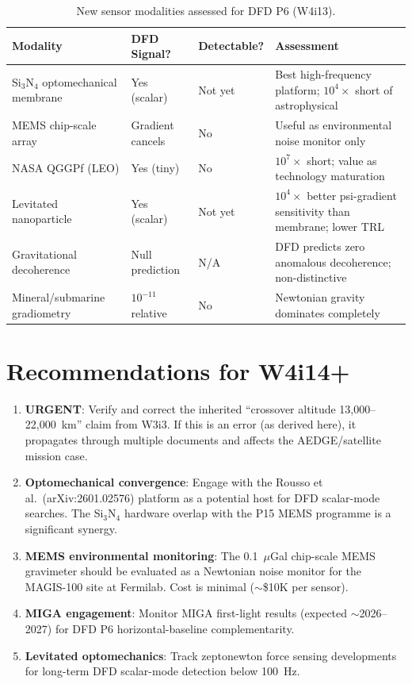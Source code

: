 \documentclass[11pt]{article}
\theoremstyle{definition}
\theoremstyle{remark}
\begin{document}
\begin{table}[H]
\centering
\small
\caption{New sensor modalities assessed for DFD P6 (W4i13).}
\begin{tabular}{@{}p{3.5cm}p{2cm}p{2cm}p{5cm}@{}}
\toprule
Modality & DFD Signal? & Detectable? & Assessment \\
\midrule
Si$_3$N$_4$ optomechanical membrane & Yes (scalar) & Not yet &
  Best high-frequency platform; $10^4\times$ short of astrophysical \\
MEMS chip-scale array & Gradient cancels & No &
  Useful as environmental noise monitor only \\
NASA QGGPf (LEO) & Yes (tiny) & No &
  $10^7\times$ short; value as technology maturation \\
Levitated nanoparticle & Yes (scalar) & Not yet &
  $10^4\times$ better psi-gradient sensitivity than membrane;
  lower TRL \\
Gravitational decoherence & Null prediction & N/A &
  DFD predicts zero anomalous decoherence; non-distinctive \\
Mineral/submarine gradiometry & $10^{-11}$ relative & No &
  Newtonian gravity dominates completely \\
\bottomrule
\end{tabular}
\end{table}

\section*{Recommendations for W4i14+}

\begin{enumerate}
\item \textbf{URGENT}: Verify and correct the inherited
  ``crossover altitude 13,000--22,000~km'' claim from W3i3.
  If this is an error (as derived here), it propagates through
  multiple documents and affects the AEDGE/satellite mission case.

\item \textbf{Optomechanical convergence}: Engage with the
  Rousso et al.\ (arXiv:2601.02576) platform as a potential
  host for DFD scalar-mode searches. The Si$_3$N$_4$ hardware
  overlap with the P15 MEMS programme is a significant synergy.

\item \textbf{MEMS environmental monitoring}: The 0.1~$\mu$Gal
  chip-scale MEMS gravimeter should be evaluated as a Newtonian
  noise monitor for the MAGIS-100 site at Fermilab. Cost is minimal
  ($\sim$\$10K per sensor).

\item \textbf{MIGA engagement}: Monitor MIGA first-light results
  (expected $\sim$2026--2027) for DFD P6 horizontal-baseline
  complementarity.

\item \textbf{Levitated optomechanics}: Track zeptonewton force
  sensing developments for long-term DFD scalar-mode detection
  below 100~Hz.
\end{enumerate}
\end{document}
